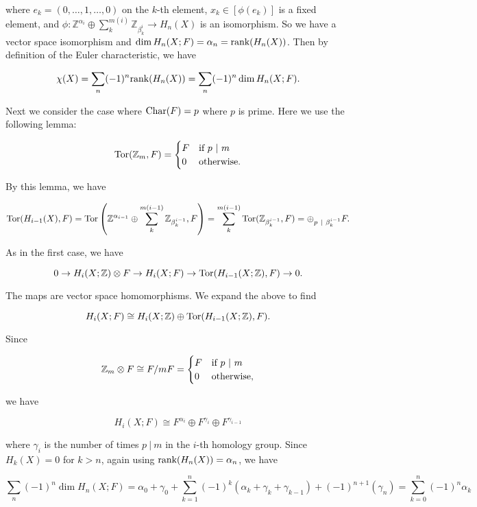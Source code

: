 \documentclass{article}
\newcommand{\Z}{\mathbb{Z}}
\newcommand{\Tor}{\textnormal{Tor}}
\newcommand{\Char}{\textnormal{Char}}
\begin{document}
where $e_{k} = (0,\ldots, 1,\ldots, 0)$ on the $k$-th element, $x_{k}\in [\phi(e_{k})]$ is a fixed element, and $\phi: \Z^{\alpha_{i}}\oplus \sum_{k}^{m(i)}\Z_{\beta_{k}^{i}}\to H_{n}(X)$ is an isomorphism. So we have a vector space isomorphism and $\dim H_{n}(X; F) = \alpha_{n} = \textnormal{rank} (H_{n}(X))$. Then by definition of the Euler characteristic, we have

$$\chi(X) = \sum_{n}(-1)^{n}\textnormal{rank}(H_{n}(X)) = \sum_{n}(-1)^{n}\dim H_{n}(X; F).$$

Next we consider the case where $\Char(F) = p$ where $p$ is prime. Here we use the following lemma:

\[\Tor(\Z_{m}, F) = \begin{cases} F & \textnormal{if } p\ |\ m\\ 0 & \textnormal{otherwise}. \end{cases}\]

By this lemma, we have

$$\Tor(H_{i-1}(X), F) = \Tor\left(\Z^{\alpha_{i-1}}\oplus \sum_{k}^{m(i-1)}\Z_{\beta_{k}^{i-1}}, F\right) = \sum_{k}^{m(i-1)} \Tor(\Z_{\beta_{k}^{i-1}}, F) = \oplus_{p\ |\ \beta_{k}^{i-1}} F.$$

As in the first case, we have

$$0\to H_{i}(X; \Z)\otimes F\to H_{i}(X; F)\to \Tor(H_{i-1}(X; \Z), F)\to 0.$$

The maps are vector space homomorphisms. We expand the above to find

$$H_{i}(X; F)\cong H_{i}(X; \Z)\oplus \Tor(H_{i-1}(X; \Z), F).$$

Since

\[\Z_{m}\otimes F\cong F/mF = \begin{cases} F & \textnormal{if } p\ |\ m\\ 0 & \textnormal{otherwise}, \end{cases}\]

we have

$$H_{i}(X; F)\cong F^{\alpha_{i}}\oplus F^{\gamma_{i}}\oplus F^{\gamma_{i-1}}$$

where $\gamma_{i}$ is the number of times $p\ |\ m$ in the $i$-th homology group. Since $H_{k}(X) = 0$ for $k > n$, again using $\textnormal{rank}(H_{n}(X)) = \alpha_{n}$, we have

$$\sum_{n}(-1)^{n}\dim H_{n}(X; F) = \alpha_{0} + \gamma_{0} + \sum_{k=1}^{n} (-1)^{k}(\alpha_{k} + \gamma_{k} + \gamma_{k-1}) + (-1)^{n+1}(\gamma_{n}) = \sum_{k=0}^{n} (-1)^{n}\alpha_{k}$$
\end{document}
